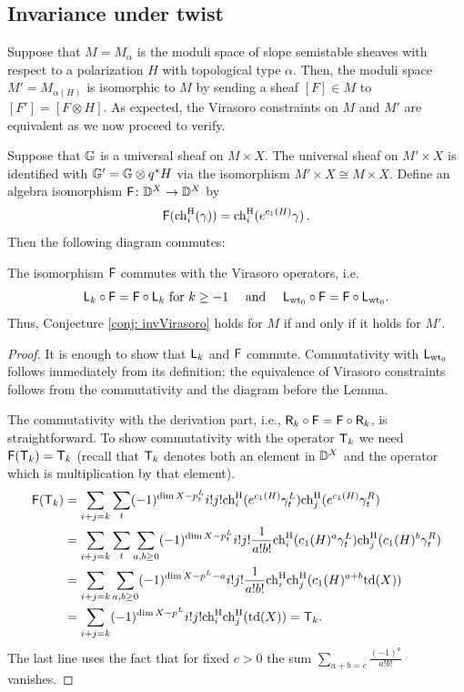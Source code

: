 \documentclass[a4paper, 12pt]{amsart}
\begin{document}
\subsection{Invariance under twist}
\label{sec: invariancetwist}


Suppose that $M=M_\alpha$ is the moduli space of slope semistable sheaves with respect to a polarization $H$ with topological type $\alpha$. Then, the moduli space $M'=M_{\alpha(H)}$ is isomorphic to $M$ by sending a sheaf $[F]\in M$ to $[F']=[F\otimes H]$. As expected, the Virasoro constraints on $M$ and $M'$ are equivalent as we now proceed to verify. 

Suppose that ${\mathbb{G}}$ is a universal sheaf on $M\times X$. The universal sheaf on $M'\times X$ is identified with ${\mathbb{G}}'={\mathbb{G}}\otimes q^\ast H$ via the isomorphism $M'\times X\cong M\times X$. Define an algebra isomorphism $\mathsf F\colon {\mathbb{D}}^X\to {\mathbb{D}}^X$ by
\[{\mathsf{F}}(\mathrm{ch}^{\mathrm{H}}_i(\gamma))=\mathrm{ch}^{\mathrm{H}}_i(e^{c_1(H)} \gamma)\,.\]
Then the following diagram commutes:
\begin{center}
\end{center}


\begin{lemma}\label{lem: twist}
The isomorphism ${\mathsf{F}}$ commutes with the Virasoro operators, i.e.\[{\mathsf{L}}_k\circ {\mathsf{F}}={\mathsf{F}}\circ {\mathsf{L}}_k\textup{ for $k\geq -1\quad$   and }\quad\mathsf{L}_{{\mathrm{wt}_0}}\circ {\mathsf{F}}={\mathsf{F}}\circ \mathsf{L}_{{\mathrm{wt}_0}}.\]
Thus, Conjecture \ref{conj: invVirasoro} holds for $M$ if and only if it holds for $M'$.	
\end{lemma}
\begin{proof}
It is enough to show that ${\mathsf{L}}_k$ and ${\mathsf{F}}$ commute. Commutativity with $\mathsf{L}_{{\mathrm{wt}_0}}$ follows immediately from its definition; the equivalence of Virasoro constraints follows from the commutativity and the diagram before the Lemma.

The commutativity with the derivation part, i.e., $\mathsf{R}_k\circ {\mathsf{F}}={\mathsf{F}}\circ \mathsf{R}_k$, is straightforward. To show commutativity with the operator ${\mathsf{T}}_k$ we need ${\mathsf{F}}({\mathsf{T}}_k)={\mathsf{T}}_k$ (recall that ${\mathsf{T}}_k$ denotes both an element in ${\mathbb{D}}^X$ and the operator which is multiplication by that element). 
\begin{align*}{\mathsf{F}}({\mathsf{T}}_k)&=\sum_{i+j=k}\sum_t(-1)^{\dim X-p^L_t}i!j!\mathrm{ch}^{\mathrm{H}}_i(e^{c_1(H)}\gamma_t^L)\mathrm{ch}^{\mathrm{H}}_j(e^{c_1(H)}\gamma_t^R)\\
&=\sum_{i+j=k}\sum_t \sum_{a, b\geq 0}(-1)^{\dim X-p^L_t}i!j!\frac{1}{a!b!}\mathrm{ch}^{\mathrm{H}}_i(c_1(H)^a\gamma_t^L)\mathrm{ch}^{\mathrm{H}}_j(c_1(H)^b\gamma_t^R)\\
&=\sum_{i+j=k} \sum_{a, b\geq 0}(-1)^{\dim X-p^L-a}i!j!\frac{1}{a!b!}\mathrm{ch}^{\mathrm{H}}_i\mathrm{ch}^{\mathrm{H}}_j(c_1(H)^{a+b}\mathrm{td}(X))\\
&=\sum_{i+j=k} (-1)^{\dim X-p^L}i!j!\mathrm{ch}^{\mathrm{H}}_i\mathrm{ch}^{\mathrm{H}}_j(\mathrm{td}(X))={\mathsf{T}}_k.
\end{align*}
The last line uses the fact that for fixed $c>0$ the sum $\sum\limits_{a+b=c}\frac{(-1)^a}{a!b!}$ vanishes.\qedhere
\end{proof}
\end{document}
